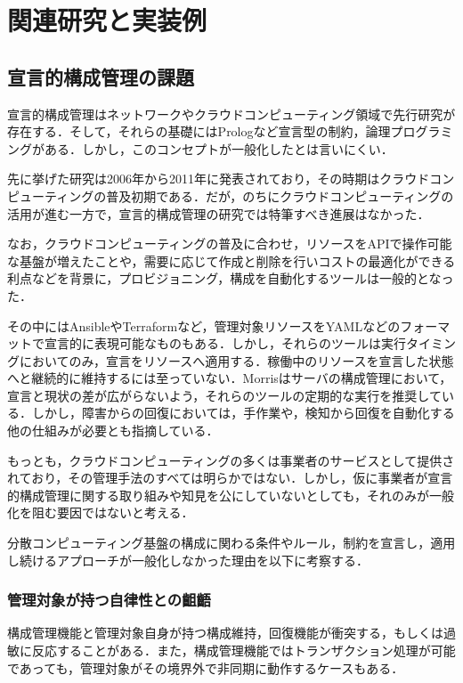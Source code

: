\documentclass[12pt,a4j]{ujreport}
\begin{document}
\chapter{関連研究と実装例}

\section{宣言的構成管理の課題}
宣言的構成管理はネットワークやクラウドコンピューティング領域で先行研究が存在する\cite{ref1,ref9,ref10}．そして，それらの基礎にはProlog\cite{ref11}など宣言型の制約，論理プログラミングがある．しかし，このコンセプトが一般化したとは言いにくい．

先に挙げた研究\cite{ref1,ref9,ref10}は2006年から2011年に発表されており，その時期はクラウドコンピューティングの普及初期である．だが，のちにクラウドコンピューティングの活用が進む一方で，宣言的構成管理の研究では特筆すべき進展はなかった．

なお，クラウドコンピューティングの普及に合わせ，リソースをAPIで操作可能な基盤が増えたことや，需要に応じて作成と削除を行いコストの最適化ができる利点などを背景に，プロビジョニング，構成を自動化するツールは一般的となった．

その中にはAnsibleやTerraformなど，管理対象リソースをYAMLなどのフォーマットで宣言的に表現可能なものもある．しかし，それらのツールは実行タイミングにおいてのみ，宣言をリソースへ適用する．稼働中のリソースを宣言した状態へと継続的に維持するには至っていない．Morrisはサーバの構成管理において，宣言と現状の差が広がらないよう，それらのツールの定期的な実行を推奨している\cite{ref12}．しかし，障害からの回復においては，手作業や，検知から回復を自動化する他の仕組みが必要とも指摘している．

もっとも，クラウドコンピューティングの多くは事業者のサービスとして提供されており，その管理手法のすべては明らかではない．しかし，仮に事業者が宣言的構成管理に関する取り組みや知見を公にしていないとしても，それのみが一般化を阻む要因ではないと考える．

分散コンピューティング基盤の構成に関わる条件やルール，制約を宣言し，適用し続けるアプローチが一般化しなかった理由を以下に考察する．

\subsection{管理対象が持つ自律性との齟齬}
構成管理機能と管理対象自身が持つ構成維持，回復機能が衝突する，もしくは過敏に反応することがある．また，構成管理機能ではトランザクション処理が可能であっても，管理対象がその境界外で非同期に動作するケースもある．
\end{document}
